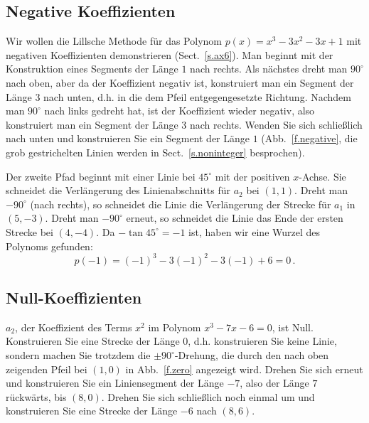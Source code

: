 \subsection{Negative Koeffizienten}\label{s.negative}
Wir wollen die Lillsche Methode für das Polynom $p(x)=x^3-3x^2-3x+1$ mit negativen Koeffizienten demonstrieren (Sect.~\ref{s.ax6}). Man beginnt mit der Konstruktion eines Segments der Länge $1$ nach rechts. Als nächstes dreht man $90^\circ$ nach oben, aber da der Koeffizient negativ ist, konstruiert man ein Segment der Länge $3$ nach unten, d.h. in die dem Pfeil entgegengesetzte Richtung. Nachdem man $90^\circ$ nach links gedreht hat, ist der Koeffizient wieder negativ, also konstruiert man ein Segment der Länge $3$ nach rechts. Wenden Sie sich schließlich nach unten und konstruieren Sie ein Segment der Länge $1$ (Abb.~\ref{f.negative}, die grob gestrichelten Linien werden in Sect.~\ref{s.noninteger} besprochen).

Der zweite Pfad beginnt mit einer Linie bei $45^\circ$ mit der positiven $x$-Achse. Sie schneidet die Verlängerung des Linienabschnitts für $a_2$ bei $(1,1)$. Dreht man $-90^\circ$ (nach rechts), so schneidet die Linie die Verlängerung der Strecke für $a_1$ in $(5,-3)$. Dreht man $-90^\circ$ erneut, so schneidet die Linie das Ende der ersten Strecke bei $(4,-4)$. Da $-\tan 45^\circ=-1$ ist, haben wir eine Wurzel des Polynoms gefunden:
\[p(-1)=(-1)^3-3(-1)^2-3(-1)+6=0\,.\]

\subsection{Null-Koeffizienten}\label{s.zero}
$a_2$, der Koeffizient des Terms $x^2$ im Polynom $x^3-7x-6=0$, ist Null. Konstruieren Sie eine Strecke der Länge $0$, d.h. konstruieren Sie keine Linie, sondern machen Sie trotzdem die $\pm 90^\circ$-Drehung, die durch den nach oben zeigenden Pfeil bei $(1,0)$ in Abb.~\ref{f.zero} angezeigt wird. Drehen Sie sich erneut und konstruieren Sie ein Liniensegment der Länge $-7$, also der Länge $7$ rückwärts, bis $(8,0)$. Drehen Sie sich schließlich noch einmal um und konstruieren Sie eine Strecke der Länge $-6$ nach $(8,6)$.

